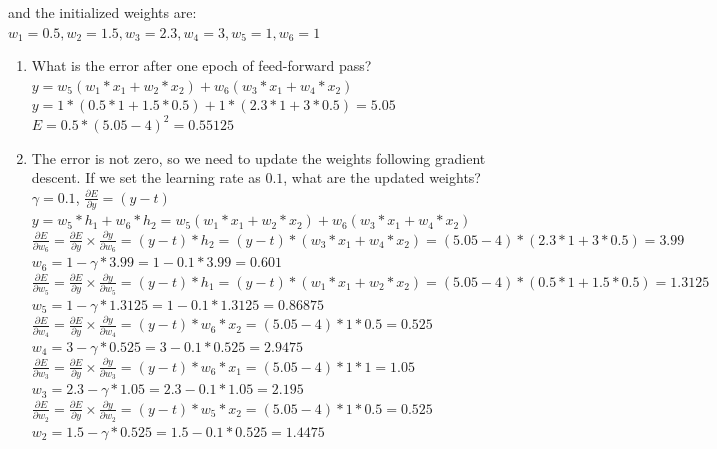 \documentclass[conference]{IEEEtran}
\begin{document}
and the initialized weights are: $w_1 = 0.5, w_2 = 1.5, w_3 = 2.3, w_4 = 3, w_5 = 1, w_6 = 1$
\begin{enumerate}
    \item What is the error after one epoch of feed-forward pass?\\
    $y = w_5(w_1 * x_1 + w_2 * x_2) + w_6 (w_3 * x_1 + w_4 * x_2)$\\
    $y = 1*(0.5*1+1.5*0.5)+1*(2.3*1+3*0.5) = 5.05$\\
    $E = 0.5 * (5.05-4)^2 = 0.55125$
    \item The error is not zero, so we need to update the weights following gradient descent. If we set the learning rate as $0.1$, what are the updated weights?\\
    $\gamma = 0.1$, $\frac{\partial E}{\partial y} = (y-t)$\\
    $y = w_5*h_1 + w_6*h_2 = w_5(w_1 * x_1 + w_2 * x_2) + w_6 (w_3 * x_1 + w_4 * x_2)$\\

	$\frac{\partial E}{\partial w_6}=\frac{\partial E}{\partial y} \times \frac{\partial y}{\partial w_6}=(y-t)*h_2=(y-t)*(w_3 * x_1 + w_4 * x_2)=(5.05-4)*(2.3*1+3*0.5)=3.99$\\
	$w_6 = 1 - \gamma * 3.99 = 1 - 0.1 * 3.99 = 0.601$\\
	
	$\frac{\partial E}{\partial w_5}=\frac{\partial E}{\partial y} \times \frac{\partial y}{\partial w_5}=(y-t)*h_1=(y-t)*(w_1 * x_1 + w_2 * x_2)=(5.05-4)*(0.5*1+1.5*0.5)=1.3125$\\
	$w_5=1 - \gamma * 1.3125 = 1 - 0.1 * 1.3125 = 0.86875$\\
	
	$\frac{\partial E}{\partial w_4}=\frac{\partial E}{\partial y} \times \frac{\partial y}{\partial w_4}=(y-t)*w_6 * x_2 = (5.05 - 4) * 1 * 0.5 = 0.525$\\
	$w_4=3-\gamma*0.525=3-0.1*0.525=2.9475$\\
	
	$\frac{\partial E}{\partial w_3}=\frac{\partial E}{\partial y} \times \frac{\partial y}{\partial w_3}=(y-t)*w_6*x_1 = (5.05-4)*1*1=1.05$\\
	$w_3=2.3-\gamma*1.05=2.3-0.1*1.05=2.195$\\

	$\frac{\partial E}{\partial w_2}=\frac{\partial E}{\partial y} \times \frac{\partial y}{\partial w_2}=(y-t)*w_5*x_2=(5.05-4)*1*0.5=0.525$\\
	$w_2=1.5-\gamma*0.525 = 1.5-0.1*0.525=1.4475$\\


\end{enumerate}
\end{document}
